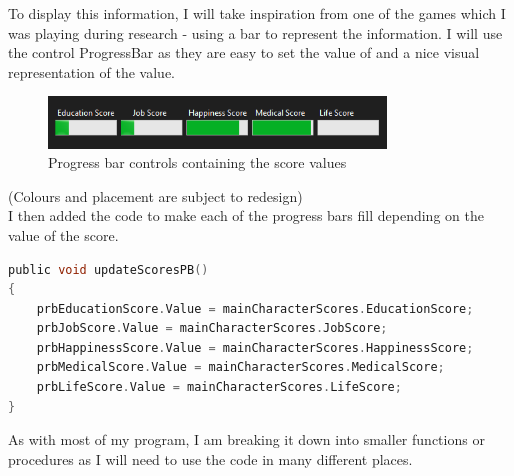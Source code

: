 To display this information, I will take inspiration from one of the games which I was playing during research - using a bar to represent the information. I will use the control ProgressBar as they are easy to set the value of and a nice visual representation of the value.
\begin{figure}[H]
    \centering
    \includegraphics[width=0.8\textwidth]{images/implementation/scoresTest3.png}
    \caption{Progress bar controls containing the score values}
    \label{fig:implementation-scoresTest3}
\end{figure}
\noindent (Colours and placement are subject to redesign)\\
I then added the code to make each of the progress bars fill depending on the value of the score.
\begin{lstlisting}[language=c, style=csharp, caption=Code to display the score in the progress bar]
public void updateScoresPB()
{
    prbEducationScore.Value = mainCharacterScores.EducationScore;
    prbJobScore.Value = mainCharacterScores.JobScore;
    prbHappinessScore.Value = mainCharacterScores.HappinessScore;
    prbMedicalScore.Value = mainCharacterScores.MedicalScore;
    prbLifeScore.Value = mainCharacterScores.LifeScore;
}
\end{lstlisting}
As with most of my program, I am breaking it down into smaller functions or procedures as I will need to use the code in many different places.

